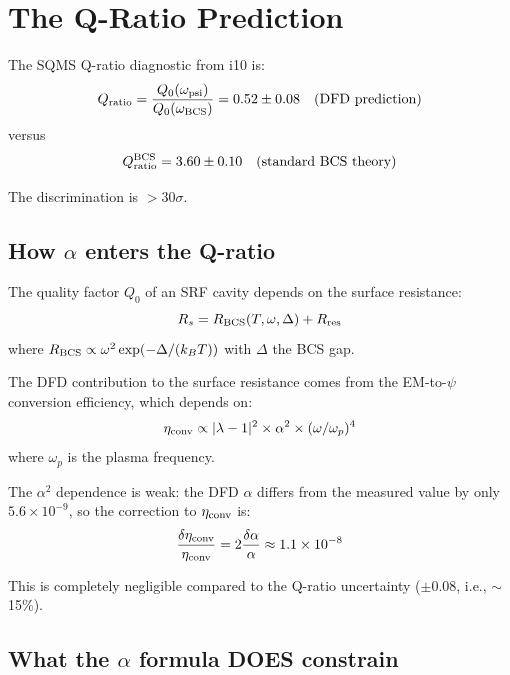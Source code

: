 \documentclass[11pt,a4paper]{article}
\begin{document}
\section{The Q-Ratio Prediction}

The SQMS Q-ratio diagnostic from i10 is:
\begin{equation}
Q_{\rm ratio} = \frac{Q_0(\omega_{\rm psi})}{Q_0(\omega_{\rm BCS})} = 0.52 \pm 0.08 \quad (\text{DFD prediction})
\end{equation}
versus
\begin{equation}
Q_{\rm ratio}^{\rm BCS} = 3.60 \pm 0.10 \quad (\text{standard BCS theory})
\end{equation}

The discrimination is $> 30\sigma$.

\subsection{How $\alpha$ enters the Q-ratio}

The quality factor $Q_0$ of an SRF cavity depends on the surface resistance:
\begin{equation}
R_s = R_{\rm BCS}(T, \omega, \Delta) + R_{\rm res}
\end{equation}
where $R_{\rm BCS} \propto \omega^2 \exp(-\Delta/(k_B T))$ with $\Delta$ the BCS gap.

The DFD contribution to the surface resistance comes from the EM-to-$\psi$ conversion efficiency, which depends on:
\begin{equation}
\eta_{\rm conv} \propto |\lambda - 1|^2 \times \alpha^2 \times (\omega/\omega_p)^4
\end{equation}
where $\omega_p$ is the plasma frequency.

The $\alpha^2$ dependence is weak: the DFD $\alpha$ differs from the measured value by only $5.6 \times 10^{-9}$, so the correction to $\eta_{\rm conv}$ is:
\begin{equation}
\frac{\delta\eta_{\rm conv}}{\eta_{\rm conv}} = 2\frac{\delta\alpha}{\alpha} \approx 1.1 \times 10^{-8}
\end{equation}

This is completely negligible compared to the Q-ratio uncertainty ($\pm 0.08$, i.e., $\sim$15\%).

\subsection{What the $\alpha$ formula DOES constrain}
\end{document}
